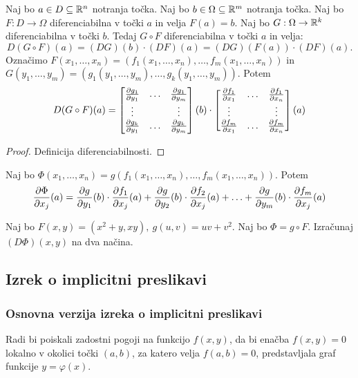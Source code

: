 \begin{izrek}
    Naj bo $a \in D \subseteq \mathbb{R}^n$ notranja točka. Naj bo $b \in \Omega \subseteq \mathbb{R}^m$ notranja točka. Naj bo $F: D \to \Omega$ diferenciabilna v točki $a$ in velja $F(a) = b$. Naj bo $G: \Omega \to \mathbb{R}^k$ diferenciabilna v točki $b$. Tedaj $G \circ F$ diferenciabilna v točki $a$ in velja:
    $$D(G \circ F)(a) = (DG)(b) \cdot (DF)(a) = (DG)(F(a)) \cdot (DF)(a).$$
    Označimo $F(x_1, \ldots, x_n) = (f_1(x_1, \ldots, x_n), \ldots, f_m(x_1, \ldots, x_n))$ in $G(y_1, \ldots, y_m) = (g_1(y_1, \ldots, y_m), \ldots, g_k(y_1, \ldots, y_m))$. Potem 
    $$D(G \circ F)(a) = \begin{bmatrix}
        \frac{\partial g_1}{\partial y_1} & \ldots & \frac{\partial g_1}{\partial y_m} \\
        \vdots & & \vdots \\
        \frac{\partial g_k}{\partial y_1} & \ldots & \frac{\partial g_k}{\partial y_m}
    \end{bmatrix}(b) \cdot \begin{bmatrix}
        \frac{\partial f_1}{\partial x_1} & \ldots & \frac{\partial f_1}{\partial x_n} \\
        \vdots & & \vdots \\
        \frac{\partial f_m}{\partial x_1} & \ldots & \frac{\partial f_m}{\partial x_n}
    \end{bmatrix}(a)$$
\end{izrek}

\begin{proof}
    Definicija diferenciabilnosti.
\end{proof}

\begin{posledica}[$k=1$, $G = g$ funkcija]
    Naj bo $\Phi(x_1, \ldots, x_n) = g(f_1(x_1, \ldots, x_n), \ldots, f_m(x_1, \ldots, x_n))$. Potem 
    $$\frac{\partial \Phi}{\partial x_j}(a) = \frac{\partial g}{\partial y_1}(b) \cdot \frac{\partial f_1}{\partial x_j}(a) + \frac{\partial g}{\partial y_2}(b) \cdot \frac{\partial f_2}{\partial x_j}(a) + \ldots + \frac{\partial g}{\partial y_m}(b) \cdot \frac{\partial f_m}{\partial x_j}(a)$$
\end{posledica}

\begin{zgled}
    Naj bo $F(x,y) = (x^2 + y, xy), \ g(u, v) = uv + v^2$. Naj bo $\Phi = g \circ F$. Izračunaj $(D\Phi)(x,y)$ na dva načina.
\end{zgled}

\newpage
\subsection{Izrek o implicitni preslikavi}
\subsubsection{Osnovna verzija izreka o implicitni preslikavi}
Radi bi poiskali zadostni pogoji na funkcijo $f(x, y)$, da bi enačba $f(x, y) = 0$ lokalno v okolici točki $(a,b)$, za katero velja $f(a,b) = 0$, predstavljala graf funkcije $y = \varphi(x)$.

